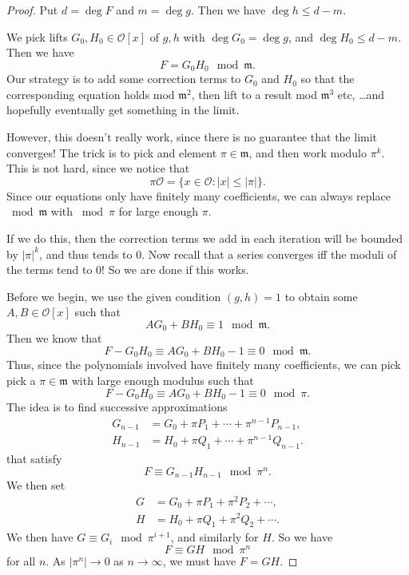 \documentclass[a4paper]{article}
\begin{document}
\begin{proof}
  Put $d = \deg F$ and $m = \deg g$. Then we have $\deg h \leq d - m$.

  We pick lifts $G_0, H_0 \in \mathcal{O}[x]$ of $g, h$ with $\deg G_0 = \deg g$, and $\deg H_0 \leq d - m$. Then we have
  \[
    F = G_0 H_0 \mod \mathfrak{m}.
  \]
  Our strategy is to add some correction terms to $G_0$ and $H_0$ so that the corresponding equation holds mod $\mathfrak{m}^2$, then lift to a result mod $\mathfrak{m}^3$ etc, \ldots and hopefully eventually get something in the limit.

  However, this doesn't really work, since there is no guarantee that the limit converges! The trick is to pick and element $\pi \in \mathfrak{m}$, and then work modulo $\pi^k$. This is not hard, since we notice that
  \[
    \pi \mathcal{O} = \{x \in \mathcal{O}: |x| \leq |\pi|\}.
  \]
  Since our equations only have finitely many coefficients, we can always replace $\bmod \mathfrak{m}$ with $\bmod \pi$ for large enough $\pi$.

  If we do this, then the correction terms we add in each iteration will be bounded by $|\pi|^k$, and thus tends to $0$. Now recall that a series converges iff the moduli of the terms tend to $0$! So we are done if this works.

  Before we begin, we use the given condition $(g, h) = 1$ to obtain some $A, B \in \mathcal{O}[x]$ such that
  \[
    AG_0 + B H_0 \equiv 1 \mod \mathfrak{m}.
  \]
  Then we know that
  \[
    F - G_0 H_0 \equiv AG_0 + BH_0 - 1 \equiv 0 \mod \mathfrak{m}.
  \]
  Thus, since the polynomials involved have finitely many coefficients, we can pick pick a $\pi \in \mathfrak{m}$ with large enough modulus such that
  \[
    F - G_0 H_0 \equiv AG_0 + BH_0 - 1 \equiv 0 \mod \pi.
  \]
  The idea is to find successive approximations
  \begin{align*}
    G_{n - 1} &= G_0 + \pi P_1 + \cdots + \pi^{n - 1} P_{n - 1},\\
    H_{n - 1} &= H_0 + \pi Q_1 + \cdots + \pi^{n - 1} Q_{n - 1}.
  \end{align*}
  that satisfy
  \[
    F \equiv G_{n - 1}H_{n - 1}\mod \pi^n.
  \]
  We then set
  \begin{align*}
    G &= G_0 + \pi P_1 + \pi^2 P_2 + \cdots,\\
    H &= H_0 + \pi Q_1 + \pi^2 Q_2 + \cdots.
  \end{align*}
  We then have $G \equiv G_i \mod \pi^{i + 1}$, and similarly for $H$. So we have
  \[
    F \equiv GH \mod \pi^n
  \]
  for all $n$. As $|\pi^n| \to 0$ as $n \to \infty$, we must have $F = GH$.


\end{proof}
\end{document}
